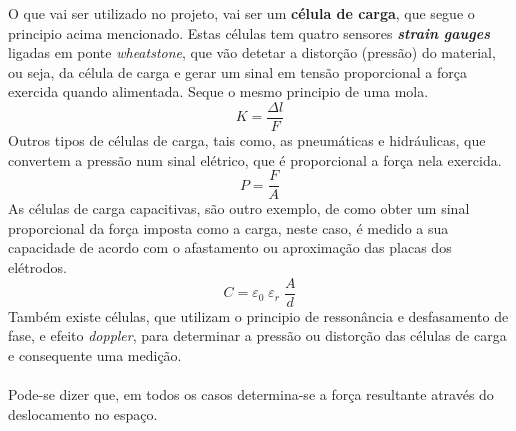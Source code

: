 O que vai ser utilizado no projeto, vai ser um \textbf{célula de carga}, que segue o principio acima mencionado. Estas células tem quatro sensores \textit{\textbf{strain gauges}} ligadas em ponte \textit{wheatstone}, que vão detetar a distorção (pressão) do material, ou seja, da célula de carga e gerar um sinal em tensão proporcional a força exercida quando alimentada. Seque o mesmo principio de uma mola.
\begin{equation}
	\label{eq:Hooke}
	K = \frac{\Delta l}{F}
\end{equation}
Outros tipos de células de carga, tais como, as pneumáticas e hidráulicas, que convertem a pressão num sinal elétrico, que é proporcional a força nela exercida.
\begin{equation}
	\label{eq:Preasure}
	P = \frac{F}{A}
\end{equation}
As células de carga capacitivas, são outro exemplo, de como obter um sinal proporcional da força imposta como a carga, neste caso, é medido a sua capacidade de acordo com o afastamento ou aproximação das placas dos elétrodos.
\begin{equation}
	\label{eq:Capacity}
	C = \varepsilon_{0} \; \varepsilon_{r} \; \frac{A}{d}
\end{equation}
Também existe células, que utilizam o principio de ressonância e desfasamento de fase, e efeito \textit{doppler}, para determinar a pressão ou distorção das células de carga e consequente uma medição.
\\
\\
Pode-se dizer que, em todos os casos determina-se a força resultante através do deslocamento no espaço.
